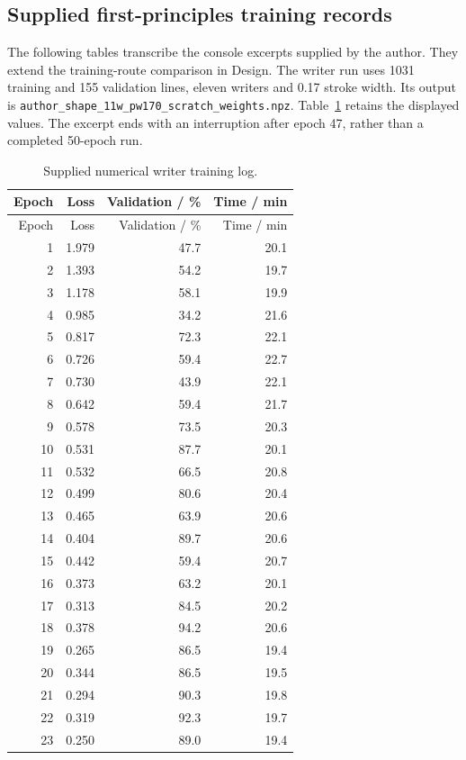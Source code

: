 \subsection{Supplied first-principles training records}\label{app:training-records}
The following tables transcribe the console excerpts supplied by the author. They extend the training-route comparison in Design. The writer run uses 1031 training and 155 validation lines, eleven writers and 0.17 stroke width. Its output is \texttt{author\_shape\_11w\_pw170\_scratch\_weights.npz}. Table~\ref{tab:app-author-log} retains the displayed values. The excerpt ends with an interruption after epoch 47, rather than a completed 50-epoch run.
\begin{longtable}{rrrr}
\caption{Supplied numerical writer training log.}\label{tab:app-author-log}\\
\toprule Epoch & Loss & Validation / \% & Time / min\\\midrule\endfirsthead
\toprule Epoch & Loss & Validation / \% & Time / min\\\midrule\endhead
1 & 1.979 & 47.7 & 20.1\\
2 & 1.393 & 54.2 & 19.7\\
3 & 1.178 & 58.1 & 19.9\\
4 & 0.985 & 34.2 & 21.6\\
5 & 0.817 & 72.3 & 22.1\\
6 & 0.726 & 59.4 & 22.7\\
7 & 0.730 & 43.9 & 22.1\\
8 & 0.642 & 59.4 & 21.7\\
9 & 0.578 & 73.5 & 20.3\\
10 & 0.531 & 87.7 & 20.1\\
11 & 0.532 & 66.5 & 20.8\\
12 & 0.499 & 80.6 & 20.4\\
13 & 0.465 & 63.9 & 20.6\\
14 & 0.404 & 89.7 & 20.6\\
15 & 0.442 & 59.4 & 20.7\\
16 & 0.373 & 63.2 & 20.1\\
17 & 0.313 & 84.5 & 20.2\\
18 & 0.378 & 94.2 & 20.6\\
19 & 0.265 & 86.5 & 19.4\\
20 & 0.344 & 86.5 & 19.5\\
21 & 0.294 & 90.3 & 19.8\\
22 & 0.319 & 92.3 & 19.7\\
23 & 0.250 & 89.0 & 19.4\\

\end{longtable}
